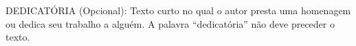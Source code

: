 
\begin{dedicatoria}


DEDICATÓRIA (Opcional): Texto curto no qual o autor presta uma homenagem ou dedica seu trabalho a alguém. A palavra “dedicatória” não deve preceder o texto. 

\end{dedicatoria}
